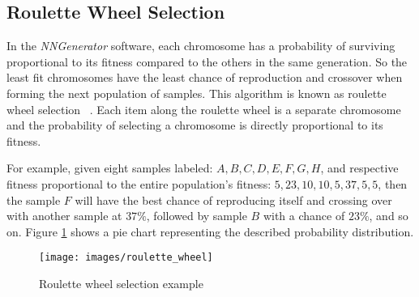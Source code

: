 \subsection{Roulette Wheel Selection}
In the {\it NNGenerator} software, each chromosome has a probability of surviving proportional to its fitness compared to the others in the same generation. 
So the least fit chromosomes have the least chance of reproduction and crossover when forming the next population of samples. 
This algorithm is known as roulette wheel selection ~\cite[237]{goldberg}.
Each item along the roulette wheel is a separate chromosome and the probability of selecting a chromosome is directly proportional to its fitness.

For example, given eight samples labeled: $A, B, C, D, E, F, G, H$, and respective fitness proportional to the entire population's fitness: 
$5, 23, 10, 10, 5, 37, 5, 5$, then the sample $F$ will have the best chance of reproducing itself and crossing over with another sample at $37\%$, followed by sample $B$ with a chance of $23\%$, and so on.
Figure \ref{roulette_wheel} shows a pie chart representing the described probability distribution.

\begin{figure}[h!]
  \centering
  \texttt{[image: images/roulette\_wheel]}
  \caption{Roulette wheel selection example}
  \label{roulette_wheel}
\end{figure}
